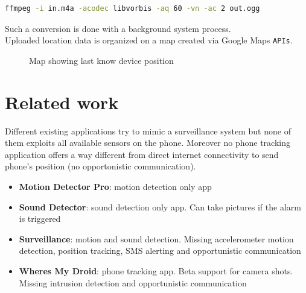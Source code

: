 \documentclass[conference, 11pt]{IEEEtran}
\begin{document}
\begin{lstlisting}[language=Bash, caption=FFMPEG command to convert aac to mp3]
ffmpeg -i in.m4a -acodec libvorbis -aq 60 -vn -ac 2 out.ogg
\end{lstlisting}

Such a conversion is done with a background system process.\\

Uploaded location data is organized on a map created via Google Maps \texttt{APIs}.

\begin{figure}[!ht]
\begin{center}
\caption{Map showing last know device position}
\label{img:slideshow}
\end{center}
\end{figure}

\section{\textbf{Related work}}
Different existing applications try to mimic a surveillance system but none of them exploits all available sensors on the phone. Moreover no phone tracking application offers a way different from direct internet connectivity to send phone's position (no opportonistic communication).\\

\begin{itemize}
	\item \textbf{Motion Detector Pro}: motion detection only app
	\item \textbf{Sound Detector}: sound detection only app. Can take pictures if the alarm is triggered
	\item \textbf{Surveillance}: motion and sound detection. Missing accelerometer motion detection, position tracking, SMS alerting and opportunistic communication
	\item \textbf{Wheres My Droid}: phone tracking app. Beta support for camera shots. Missing intrusion detection and opportunistic communication

\end{itemize}
\end{document}
